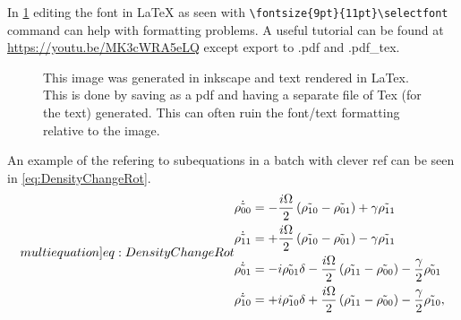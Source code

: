 
In \cref{fig:label} editing the font in LaTeX as seen with \verb|\fontsize{9pt}{11pt}\selectfont| command can help with formatting problems.
A useful tutorial can be found at \href{https://youtu.be/MK3cWRA5eLQ}{\url{https://youtu.be/MK3cWRA5eLQ}} except export to .pdf and .pdf\_tex.
\begin{figure}[tbp]
	\centering
	{
	\fontsize{12pt}{14pt}\selectfont
	\def\svgwidth{0.5\linewidth}
	
	}
	\caption[short caption]{\label{fig:label}
		This image was generated in inkscape and text rendered in LaTex.
		This is done by saving as a pdf and having a separate file of Tex (for the text) generated.
		This can often ruin the font/text formatting relative to the image.
	}
\end{figure}

An example of the refering to subequations in a batch with clever ref can be seen in \cref{eq:DensityChangeRot}.
\begin{subequations}\label[multiequation]{eq:DensityChangeRot}
	\begin{align}
		\dot{\tilde{\rho_{00}}}&= -\frac{i\Omega}{2} \left( \tilde{\rho_{10}}- \tilde{\rho_{01}} \right) + \gamma \tilde{\rho_{11}}
		\\
		\dot{\tilde{\rho_{11}}}&= +\frac{i\Omega}{2} \left( \tilde{\rho_{10}}- \tilde{\rho_{01}} \right) - \gamma \tilde{\rho_{11}}
		\\
		\dot{\tilde{\rho_{01}}}&= -i \tilde{\rho_{01}} \delta - \frac{i\Omega}{2} \left( \tilde{\rho_{11}}- \tilde{\rho_{00}} \right) - \frac{\gamma}{2} \tilde{\rho_{01}}
		\\
		\dot{\tilde{\rho_{10}}}&=+ i \tilde{\rho_{10}} \delta + \frac{i\Omega}{2} \left( \tilde{\rho_{11}}- \tilde{\rho_{00}} \right) - \frac{\gamma}{2} \tilde{\rho_{10}},
	\end{align}
\end{subequations}
